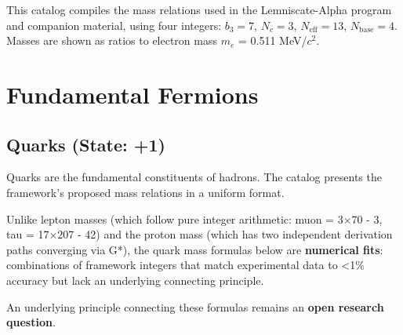 \documentclass[
  11pt,
  letterpaper,
  twoside,
  openany]{book}
\makeatletter
\let\orig@section\section
\renewcommand{\section}{\needspace{8\baselineskip}\orig@section}
\let\orig@subsection\subsection
\renewcommand{\subsection}{\needspace{6\baselineskip}\orig@subsection}
\makeatother
\begin{document}
\begin{tcolorbox}[enhanced jigsaw, colbacktitle=quarto-callout-important-color!10!white, titlerule=0mm, bottomtitle=1mm, bottomrule=.15mm, colback=white, arc=.35mm, breakable, toprule=.15mm, title=\textcolor{quarto-callout-important-color}{\faExclamation}\hspace{0.5em}{Major Update: Masses Are Derived}, rightrule=.15mm, coltitle=black, leftrule=.75mm, colframe=quarto-callout-important-color-frame, toptitle=1mm, opacityback=0, opacitybacktitle=0.6, left=2mm]

This catalog compiles the mass relations used in the Lemniscate-Alpha
program and companion material, using four integers: \(b_3=7\),
\(N_c=3\), \(N_{\text{eff}}=13\), \(N_{\text{base}}=4\). Masses are
shown as ratios to electron mass \(m_e\) = 0.511 MeV/\(c^2\).

\end{tcolorbox}

\section{Fundamental Fermions}\label{fundamental-fermions}

\subsection{Quarks (State: +1)}\label{quarks-state-1}

Quarks are the fundamental constituents of hadrons. The catalog presents
the framework's proposed mass relations in a uniform format.

\begin{tcolorbox}[enhanced jigsaw, colbacktitle=quarto-callout-warning-color!10!white, titlerule=0mm, bottomtitle=1mm, bottomrule=.15mm, colback=white, arc=.35mm, breakable, toprule=.15mm, title=\textcolor{quarto-callout-warning-color}{\faExclamationTriangle}\hspace{0.5em}{Epistemic Status: Numerical Fits}, rightrule=.15mm, coltitle=black, leftrule=.75mm, colframe=quarto-callout-warning-color-frame, toptitle=1mm, opacityback=0, opacitybacktitle=0.6, left=2mm]

Unlike lepton masses (which follow pure integer arithmetic: muon = 3×70
- 3, tau = 17×207 - 42) and the proton mass (which has two independent
derivation paths converging via G*), the quark mass formulas below are
\textbf{numerical fits}: combinations of framework integers that match
experimental data to \textless1\% accuracy but lack an underlying
connecting principle.

An underlying principle connecting these formulas remains an
\textbf{open research question}.

\end{tcolorbox}
\end{document}
